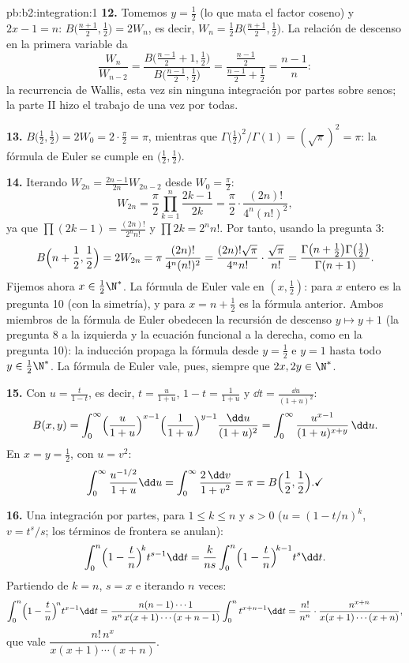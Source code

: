 \begin{solution}{pb:b2:integration:1}
\textbf{12.} Tomemos $y = \frac12$ (lo que mata el factor coseno) y
$2x - 1 = n$: $B\bigl(\frac{n+1}2, \frac12\bigr) = 2W_n$, es decir,
$W_n = \frac12 B\bigl(\frac{n+1}2,\frac12\bigr)$. La relación de
descenso en la primera variable da
\[
\frac{W_n}{W_{n-2}}
= \frac{B\bigl(\frac{n-1}2 + 1, \frac12\bigr)}
{B\bigl(\frac{n-1}2, \frac12\bigr)}
= \frac{\frac{n-1}2}{\frac{n-1}2 + \frac12}
= \frac{n-1}{n} :
\]
la recurrencia de Wallis, esta vez sin ninguna integración por
partes sobre senos; la parte II hizo el trabajo de una vez por
todas.

\textbf{13.} $B\bigl(\frac12,\frac12\bigr) = 2W_0 =
2\cdot\frac\pi2 = \pi$, mientras que
$\Gamma\bigl(\frac12\bigr)^2/\Gamma(1) = (\sqrt\pi)^2 = \pi$: la
fórmula de Euler se cumple en $\bigl(\frac12,\frac12\bigr)$.

\textbf{14.} Iterando $W_{2n} = \frac{2n-1}{2n}W_{2n-2}$ desde $W_0
= \frac\pi2$:
\[
W_{2n} = \frac\pi2\prod_{k=1}^{n}\frac{2k-1}{2k}
= \frac\pi2\cdot\frac{(2n)!}{4^n(n!)^2},
\]
ya que $\prod(2k-1) = \frac{(2n)!}{2^n n!}$ y $\prod 2k = 2^n n!$.
Por tanto, usando la pregunta 3:
\[
B\Bigl(n+\frac12, \frac12\Bigr) = 2W_{2n}
= \pi\,\frac{(2n)!}{4^n(n!)^2}
= \frac{(2n)!\sqrt\pi}{4^n n!}\cdot\frac{\sqrt\pi}{n!}
= \frac{\Gamma\bigl(n+\frac12\bigr)\Gamma\bigl(\frac12\bigr)}
{\Gamma(n+1)} .
\]
Fijemos ahora $x \in \frac12\N^*$. La fórmula de Euler vale en $(x,
\frac12)$: para $x$ entero es la pregunta 10 (con la simetría), y
para $x = n + \frac12$ es la fórmula anterior. Ambos miembros de la
fórmula de Euler obedecen la recursión de descenso $y \mapsto y + 1$
(la pregunta 8 a la izquierda y la ecuación funcional a la derecha,
como en la pregunta 10): la inducción propaga la fórmula desde $y =
\frac12$ e $y = 1$ hasta todo $y \in \frac12\N^*$. La fórmula de
Euler vale, pues, siempre que $2x, 2y \in \N^*$.

\textbf{15.} Con $u = \frac{t}{1-t}$, es decir, $t =
\frac{u}{1+u}$, $1 - t = \frac{1}{1+u}$ y $\dd t = \frac{\dd
u}{(1+u)^2}$:
\[
B(x,y) = \int_0^\infty
\Bigl(\frac{u}{1+u}\Bigr)^{x-1}
\Bigl(\frac{1}{1+u}\Bigr)^{y-1}
\frac{\dd u}{(1+u)^2}
= \int_0^\infty \frac{u^{x-1}}{(1+u)^{x+y}}\,\dd u .
\]
En $x = y = \frac12$, con $u = v^2$:
\[
\int_0^\infty \frac{u^{-1/2}}{1+u}\dd u
= \int_0^\infty \frac{2\,\dd v}{1+v^2} = \pi
= B\Bigl(\frac12,\frac12\Bigr) . \checkmark
\]

\textbf{16.} Una integración por partes, para $1 \leq k \leq n$ y
$s > 0$ ($u = (1 - t/n)^k$, $v = t^s/s$; los términos de frontera se
anulan):
\[
\int_0^n \Bigl(1-\frac tn\Bigr)^{\!k} t^{s-1}\dd t
= \frac{k}{ns}\int_0^n \Bigl(1-\frac tn\Bigr)^{\!k-1}
t^{s}\dd t .
\]
Partiendo de $k = n$, $s = x$ e iterando $n$ veces:
\[
\int_0^n \Bigl(1-\frac tn\Bigr)^{\!n} t^{x-1}\dd t
= \frac{n(n-1)\cdots1}{n^n\,x(x+1)\cdots(x+n-1)}
\int_0^n t^{x+n-1}\dd t
= \frac{n!}{n^n}\cdot
\frac{n^{x+n}}{x(x+1)\cdots(x+n)} ,
\]
que vale $\dfrac{n!\,n^x}{x(x+1)\cdots(x+n)}$.


\end{solution}
